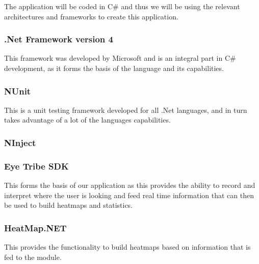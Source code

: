 The application will be coded in C# and thus we will be using the relevant architectures and frameworks to create this application.

\subsubsection{.Net Framework version 4}
\begin{flushleft}
	This framework was developed by Microsoft and is an integral part in C# development, as it forms the basis of the language and its capabilities.
\end{flushleft}

\subsubsection{NUnit}
\begin{flushleft}
This is a unit testing framework developed for all .Net languages, and in turn takes advantage of a lot of the languages capabilities.
\end{flushleft}

\subsubsection{NInject}
\begin{flushleft}
\end{flushleft}

\subsubsection{Eye Tribe SDK}
\begin{flushleft}
This forms the basis of our application as this provides the ability to record and interpret where the user is looking and feed real time information that can then be used to build heatmaps and statistics.
\end{flushleft}

\subsubsection{HeatMap.NET}
\begin{flushleft}
This provides the functionality to build heatmaps based on information that is fed to the module.
\end{flushleft}